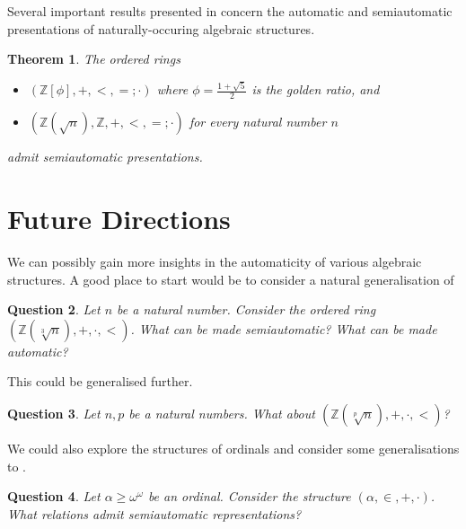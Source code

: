 \documentclass[british,a4paper,]{scrartcl}
\newtheorem{theorem}{Theorem}
\newtheorem{question}[theorem]{Question}
\theoremstyle{definition}
\theoremstyle{remark}
\newcommand{\Z}{\mathbb{Z}}
\begin{document}
Several important results presented in \autocite{semiauto} concern the automatic and semiautomatic presentations
of naturally-occuring algebraic structures.
\begin{theorem} \label{sqrtring}
    The ordered rings
    \begin{itemize}
        \item \((\Z[\phi], +, <, =; \cdot)\) where \(\phi = \frac{1+\sqrt{5}}2\) is the golden ratio, and
        \item \((\Z(\sqrt{n}), \Z, +, <, =; \cdot)\) for every natural number \(n\)
    \end{itemize}
    admit semiautomatic presentations.
\end{theorem}

\section{Future Directions}

We can possibly gain more insights in the automaticity of various algebraic structures.
A good place to start would be to consider a natural generalisation of 
\begin{question}
    Let \(n\) be a natural number.
    Consider the ordered ring \((\Z(\sqrt[3]{n}), +, \cdot, <)\).
    What can be made semiautomatic? What can be made automatic?
\end{question}
This could be generalised further.
\begin{question}
    Let \(n,p\) be a natural numbers.
    What about \((\Z(\sqrt[p]{n}), +, \cdot, <)\)?
\end{question}

We could also explore the structures of ordinals and
consider some generalisations to .
\begin{question}
    Let \(\alpha \geq \omega^\omega\) be an ordinal.
    Consider the structure \((\alpha, \in, +, \cdot)\).
    What relations admit semiautomatic representations?
\end{question}

\printbibliography
\end{document}
